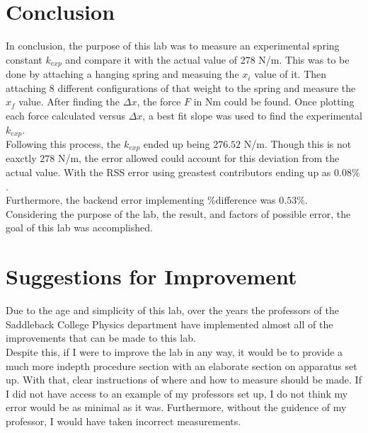 \begingroup
\let\clearpage\relax\chapter{Conclusion}

In conclusion, the purpose of this lab was to measure an experimental spring 
constant $k_{exp}$ and compare it with the actual value of $278$ N/m. This was to be done 
by attaching a hanging spring and measuing the $x_i$ value of it. Then attaching
8 different configurations of that weight to the spring and measure the $x_f$
value. After finding the $\Delta x$, the force $F$ in Nm could be found.
Once plotting each force calculated versus $\Delta x$, a best fit slope was 
used to find the experimental $k_{exp}$.\\

\noindent Following this process, the $k_{exp}$ ended up being $276.52$ N/m. Though this is not
eaxctly $278$ N/m, the error allowed could account for this deviation from the actual
value. With the RSS error using greastest contributors ending up as $0.08\%$.\\

\noindent Furthermore, the backend error implementing \%difference was $0.53\%$.\\

\noindent Considering the purpose of the lab, the result, and factors of possible error,
the goal of this lab was accomplished.

\chapter{Suggestions for Improvement}
\endgroup

\noindent Due to the age and simplicity of this lab, over the years the professors
of the Saddleback College Physics department have implemented almost all of the
improvements that can be made to this lab.\\

\noindent Despite this, if I were to improve the lab in any way, it would be to 
provide a much more indepth procedure section with an elaborate section on 
apparatus set up. With that, clear instructions of where and how to measure
should be made. If I did not have access to an example of my professors 
set up, I do not think my error would be as minimal as it was. Furthermore,
without the guidence of my professor, I would have taken incorrect measurements.\\